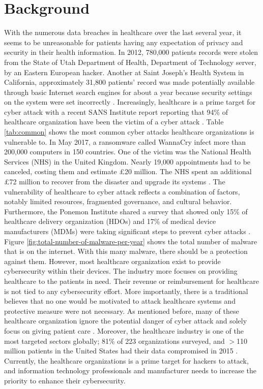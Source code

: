 \documentclass[pdf,bookmarks,colorlinks=true]{IEEEtran}
\begin{document}
\section{Background}
\label{sec:Background}
With the numerous data breaches in healthcare over the last several year, it seems to be unreasonable for patients having any expectation of privacy and security in their health information. In 2012, 780,000 patients records were stolen from the State of Utah Department of Health, Department of Technology server, by an Eastern European hacker. Another at Saint Joseph's Health System in California, approximately 31,800 patients' record was made potentially available through basic Internet search engines for about a year because security settings on the system were set incorrectly \cite{murphy2015cybersecurity}. Increasingly, healthcare is a prime target for cyber attack with a recent SANS Institute report reporting that 94\% of healthcare organization have been the victim of a cyber attack \cite{williams2015cybersecurity}. Table \ref{tab:common} shows the most common cyber attacks healthcare organizations is vulnerable to. In May 2017, a ransomware called WannaCry infect more than 200,000 computers in 150 countries. One of the victim was the National Health Services (NHS) in the United Kingdom. Nearly 19,000 appointments had to be canceled, costing them and estimate \pounds20 million. The NHS spent an additional \pounds72 million to recover from the disaster and upgrade its systems \cite{ferrara2019cybersecurity}. The vulnerability of healthcare to cyber attack reflects a combination of factors, notably limited resources, fragmented governance, and cultural behavior. Furthermore, the Ponemon Institute shared a survey that showed only 15\% of healthcare delivery organization (HDOs) and 17\% of medical device manufacturers (MDMs) were taking significant steps to prevent cyber attacks \cite{busdicker2017role}. Figure \ref{fig:total-number-of-malware-per-year} shows the total number of malware that is on the internet. With this many malware, there should be a protection against them. However, most healthcare organization exist to provide cybersecurity within their devices. The industry more focuses on providing healthcare to the patients in need. Their revenue or reimbursement for healthcare is not tied to any cybersecurity effort. More importantly, there is a traditional believes that no one would be motivated to attack healthcare systems and protective measure were not necessary. As mentioned before, many of these healthcare organization ignore the potential danger of cyber attack and solely focus on giving patient care \cite{coventry2018cybersecurity}. Moreover, the healthcare industry is one of the most targeted sectors globally; 81\% of 223 organizations surveyed, and $>$110 million patients in the United States had their data compromised in 2015 \cite{martin2017cybersecurity}. Currently, the healthcare organizations is a prime target for hackers to attack, and information technology professionals and manufacturer needs to increase the priority to enhance their cybersecurity.
\end{document}
